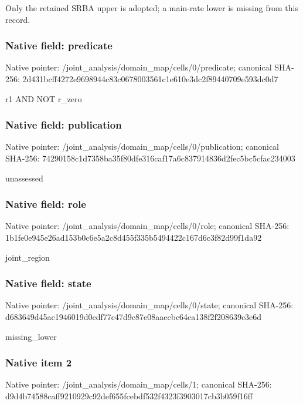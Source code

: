 \documentclass[10pt,a4paper]{article}
\begin{document}
\begingroup\raggedright\sloppy Only the retained SRBA upper is adopted;\allowbreak{} a main-rate lower is missing from this record.\par\endgroup

\subsubsection{Native field: predicate}
Native pointer: /joint\_\allowbreak{}analysis/domain\_\allowbreak{}map/cells/0/predicate; canonical SHA-256: 2d431bcff4272e9698944c83c0678003561c1e610e3dc2f89440709e593dc0d7

\begingroup\raggedright\sloppy r1 AND NOT r\_\allowbreak{}zero\par\endgroup

\subsubsection{Native field: publication}
Native pointer: /joint\_\allowbreak{}analysis/domain\_\allowbreak{}map/cells/0/publication; canonical SHA-256: 74290158c1d7358ba35f80dfe316caf17a6c837914836d2fec5bc5cfac234003

\begingroup\raggedright\sloppy unassessed\par\endgroup

\subsubsection{Native field: role}
Native pointer: /joint\_\allowbreak{}analysis/domain\_\allowbreak{}map/cells/0/role; canonical SHA-256: 1b1fe0e945e26ad153b0c6e5a2c8d455f335b5494422c167d6c3f82d99f1da92

\begingroup\raggedright\sloppy joint\_\allowbreak{}region\par\endgroup

\subsubsection{Native field: state}
Native pointer: /joint\_\allowbreak{}analysis/domain\_\allowbreak{}map/cells/0/state; canonical SHA-256: d683649d45ac1946019d0cdf77c47d9c87e08aaecbc64ea138f2f208639c3e6d

\begingroup\raggedright\sloppy missing\_\allowbreak{}lower\par\endgroup

\subsubsection{Native item 2}
Native pointer: /joint\_\allowbreak{}analysis/domain\_\allowbreak{}map/cells/1; canonical SHA-256: d9d4b74588caff9210929c92def655fcebdf532f4323f3903017cb3b059f16ff
\end{document}

